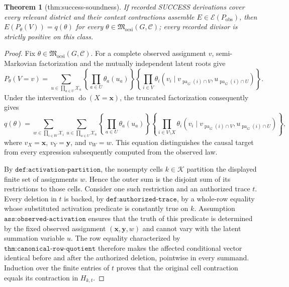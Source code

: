 \documentclass{article}
\newtheorem{theorem}{Theorem}
\begin{document}
\begin{theorem}[thm:success-soundness]\label{thm:success-soundness}
If recorded SUCCESS derivations cover every relevant district and their context contractions assemble \(E\in\mathscr E(P_{\mathrm{obs}})\), then \(E(P_{\theta}(V))=q(\theta)\) for every \(\theta\in\mathfrak M_{\mathrm{ocsi}}(G,\mathcal C)\); every recorded divisor is strictly positive on this class.
\end{theorem}
\begin{proof}
Fix \(\theta\in\mathfrak M_{\mathrm{ocsi}}(G,\mathcal C)\). For a complete observed assignment \(v\), semi-Markovian factorization and the mutually independent latent roots give
\[
 P_\theta(V=v)
 =\sum_{u\in\prod_{a\in U}\mathcal X_a}
   \left\{\prod_{a\in U}\theta_a(u_a)\right\}
   \left\{\prod_{i\in V}\theta_i(v_i\mid v_{\operatorname{pa}_G(i)\cap V},u_{\operatorname{pa}_G(i)\cap U})\right\}.
\]
Under the intervention \(\operatorname{do}(X=\mathbf x)\), the truncated factorization consequently gives
\[
 q(\theta)
 =\sum_{w\in\prod_{i\in W}\mathcal X_i}
   \sum_{u\in\prod_{a\in U}\mathcal X_a}
   \left\{\prod_{a\in U}\theta_a(u_a)\right\}
   \left\{\prod_{i\in V\setminus X}
     \theta_i(v_i\mid v_{\operatorname{pa}_G(i)\cap V},u_{\operatorname{pa}_G(i)\cap U})\right\},
\]
where \(v_X=\mathbf x\), \(v_Y=\mathbf y\), and \(v_W=w\). This equation distinguishes the causal target from every expression subsequently computed from the observed law.

By \(\texttt{def:activation-partition}\), the nonempty cells \(k\in\mathcal K\) partition the displayed finite set of assignments \(w\). Hence the outer sum is the disjoint sum of its restrictions to those cells. Consider one such restriction and an authorized trace \(t\). Every deletion in \(t\) is backed, by \(\texttt{def:authorized-trace}\), by a whole-row equality whose substituted activation predicate is constantly true on \(k\). Assumption \(\texttt{ass:observed-activation}\) ensures that the truth of this predicate is determined by the fixed observed assignment \((\mathbf x,\mathbf y,w)\) and cannot vary with the latent summation variable \(u\). The row equality characterized by \(\texttt{thm:canonical-row-quotient}\) therefore makes the affected conditional vector identical before and after the authorized deletion, pointwise in every summand. Induction over the finite entries of \(t\) proves that the original cell contraction equals its contraction in \(H_{k,t}\).


\end{proof}
\end{document}
